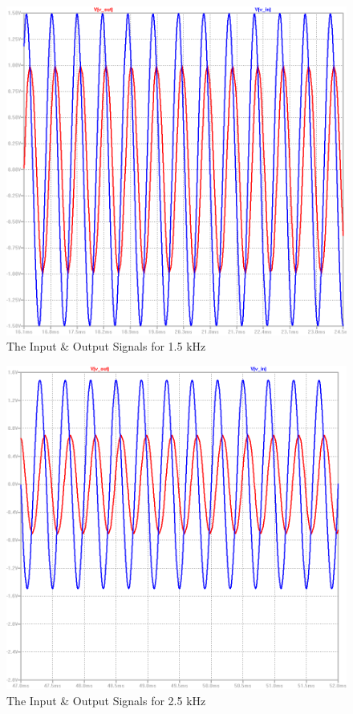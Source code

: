 \documentclass[paper]{IEEEtran}
\begin{document}
\begin{figure}[h!]
	\setlength{\unitlength}{\textwidth}
	\center 
	\includegraphics[width=0.45\unitlength]{lpf_op3.png}
	\caption{\label{fig:lpfvo2}The Input \& Output Signals for 1.5 kHz}
\end{figure} 


\begin{figure}[h!]
	\setlength{\unitlength}{\textwidth}
	\center 
	\includegraphics[width=0.45\unitlength]{lpf_op4.png}
	\caption{\label{fig:lpfvo2}The Input \& Output Signals for 2.5 kHz}
\end{figure} 
\end{document}

